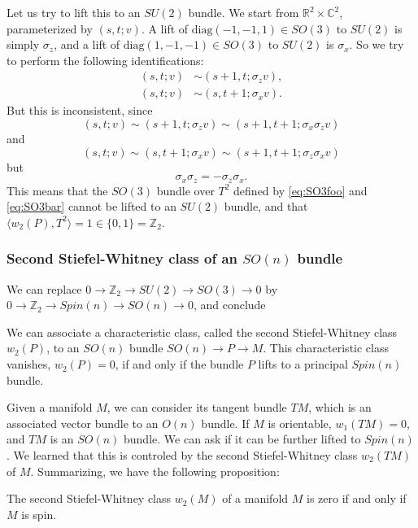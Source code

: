 \documentclass[12pt]{article}
\numberwithin{equation}{section}
\numberwithin{figure}{section}
\theoremstyle{remark}
\def\bC{\mathbb{C}}
\def\bR{\mathbb{R}}
\def\bZ{\mathbb{Z}}
\begin{document}
Let us try to lift this to an $SU(2)$ bundle. 
We start from $\bR^2\times \bC^2$, parameterized by $(s,t;v)$.
A lift of $\mathrm{diag}(-1,-1,1)\in SO(3)$ to $SU(2)$ is simply $\sigma_z$,
and a lift of $\mathrm{diag}(1,-1,-1)\in SO(3)$ to $SU(2)$ is $\sigma_x$.
So we try to perform the following identifications:
\begin{align}
  (s,t;v) &\sim (s+1,t;\sigma_z v),\\
  (s,t;v) &\sim (s,t+1;\sigma_x v).
\end{align}
But this is inconsistent, since \begin{equation}
  (s,t;v)\sim (s+1,t;\sigma_z v)\sim (s+1,t+1;\sigma_x\sigma_z v)
\end{equation} and \begin{equation}
  (s,t;v)\sim (s,t+1;\sigma_x v)\sim (s+1,t+1;\sigma_z\sigma_x v)
\end{equation} but \begin{equation}
  \sigma_x\sigma_z = - \sigma_z\sigma_x.
\end{equation}
This means that the $SO(3)$ bundle over $T^2$ defined by \eqref{eq:SO3foo} and \eqref{eq:SO3bar} cannot be lifted to an $SU(2)$ bundle,
and that $\langle w_2(P),T^2\rangle=1 \in \{0,1\}=\bZ_2$.

\subsubsection{Second Stiefel-Whitney class of an $SO(n)$ bundle}


We can replace $0\to \bZ_2\to SU(2)\to SO(3)\to 0$ by $0\to \bZ_2\to Spin(n)\to SO(n)\to 0$, and conclude 
\begin{proposition}
  We can associate a characteristic class, called
  the second Stiefel-Whitney class $w_2(P)$,
  to an $SO(n)$ bundle $SO(n)\to P\to M$.
  This characteristic class vanishes, $w_2(P)=0$, if and only if the bundle $P$ lifts to a principal $Spin(n)$ bundle.
\end{proposition}


Given a manifold $M$, we can consider its tangent bundle $TM$, which is an associated vector bundle to an $O(n)$ bundle.
If $M$ is orientable, $w_1(TM)=0$, and $TM$ is an $SO(n)$ bundle.
We can ask if it can be further lifted to $Spin(n)$.
We learned that this is controled by the second Stiefel-Whitney class $w_2(TM)$ of $M$.
Summarizing, we have the following proposition:
\begin{proposition}
The second Stiefel-Whitney class $w_2(M)$ of a manifold $M$ is zero if and only if $M$ is spin.
\end{proposition}
\end{document}
